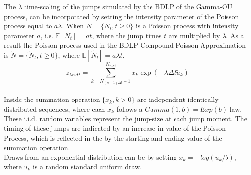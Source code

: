 The $\lambda$ time-scaling of the jumps simulated by the BDLP of the Gamma-OU process, can be incorporated by setting the intensity parameter of the Poisson process equal to $a \lambda$. When $N = \{N_t, t \geq 0\}$ is a Poisson process with intensity parameter $ a $, i.e. $ \mathbb{E}[N_t] = at $, where the jump times $t$ are multiplied by $\lambda$. As a result the Poisson process used in the BDLP Compound Poisson Approximation is $\tilde{N} = \{ \tilde{N}_t, t \geq 0\}$, where $ \mathbb{E}[\tilde{N}_t] = a\lambda t $.\\

\begin{equation}
z_{\lambda n \Delta t} = \sum_{k=N_{(n-1)\Delta t}+1}^{N_{n\Delta t}} x_{k} \exp(-\lambda \Delta t \tilde{u}_{k})
\label{eq:5-2 Gamma-OU BDLP Compound Poisson Approximation}
\end{equation}\\

Inside the summation operation $\{x_{k},k > 0\}$ are independent identically distributed sequences, where each $x_{k}$ follows a $Gamma (1,b) =  Exp(b)$ law. These i.i.d. random variables represent the jump-size at each jump moment. The timing of these jumps are indicated by an increase in value of the Poisson Process, which is reflected in the by the starting and ending value of the summation operation.\\
Draws from an exponential distribution can be by setting $x_{k}=-log(u_{k}/b)$, where $u_k$ is a random standard uniform draw.\\


